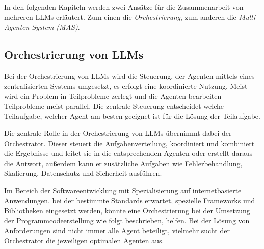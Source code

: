 

In den folgenden Kapiteln werden zwei Ansätze für die Zusammenarbeit von mehreren LLMs erläutert. Zum einen die \textit{Orchestrierung}, zum anderen die \textit{Multi-Agenten-System (MAS)}.

\subsection{Orchestrierung von LLMs}
Bei der Orchestrierung von LLMs wird die Steuerung, der Agenten mittels eines zentralisierten Systems umgesetzt, es erfolgt eine koordinierte Nutzung. Meist wird ein Problem in Teilprobleme zerlegt und die Agenten bearbeiten Teilprobleme meist parallel. Die zentrale Steuerung entscheidet welche Teilaufgabe, welcher Agent am besten geeignet ist für die Lösung der Teilaufgabe.\vspace{0.2cm}

Die zentrale Rolle in der Orchestrierung von LLMs übernimmt dabei der Orchestrator. Dieser steuert die Aufgabenverteilung, koordiniert und kombiniert die Ergebnisse und leitet sie in die entsprechenden Agenten oder erstellt daraus die Antwort, außerdem kann er zusätzliche Aufgaben wie Fehlerbehandlung, Skalierung, Datenschutz und Sicherheit ausführen.\vspace{0.2cm}

Im Bereich der Softwareentwicklung mit Spezialisierung auf internetbasierte Anwendungen, bei der bestimmte Standards erwartet, spezielle Frameworks und Bibliotheken eingesetzt werden, könnte eine Orchestrierung bei der Umsetzung der Programmcodeerstellung wie folgt beschrieben, helfen. Bei der Lösung von Anforderungen sind nicht immer alle Agent beteiligt, vielmehr sucht der Orchestrator die jeweiligen optimalen Agenten aus.\vspace{0.2cm}

